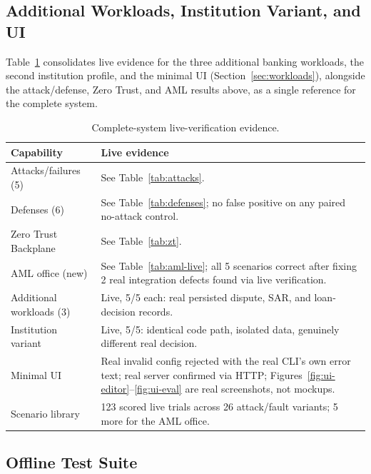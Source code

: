 \documentclass[conference]{IEEEtran}
\begin{document}
\subsection{Additional Workloads, Institution Variant, and UI}
\label{sec:exp-workloads}

Table~\ref{tab:complete-evidence} consolidates live evidence for the three additional banking workloads, the second institution profile, and the minimal UI (Section~\ref{sec:workloads}), alongside the attack/defense, Zero Trust, and AML results above, as a single reference for the complete system.

\begin{table}[t]
\centering
\caption{Complete-system live-verification evidence.}
\label{tab:complete-evidence}
\scriptsize
\begin{tabular}{@{}p{2.1cm}p{5.2cm}@{}}
\toprule
Capability & Live evidence \\
\midrule
Attacks/failures (5) & See Table~\ref{tab:attacks}. \\
Defenses (6) & See Table~\ref{tab:defenses}; no false positive on any paired no-attack control. \\
Zero Trust Backplane & See Table~\ref{tab:zt}. \\
AML office (new) & See Table~\ref{tab:aml-live}; all 5 scenarios correct after fixing 2 real integration defects found via live verification. \\
Additional workloads (3) & Live, 5/5 each: real persisted dispute, SAR, and loan-decision records. \\
Institution variant & Live, 5/5: identical code path, isolated data, genuinely different real decision. \\
Minimal UI & Real invalid config rejected with the real CLI's own error text; real server confirmed via HTTP; Figures~\ref{fig:ui-editor}--\ref{fig:ui-eval} are real screenshots, not mockups. \\
Scenario library & 123 scored live trials across 26 attack/fault variants; 5 more for the AML office. \\
\bottomrule
\end{tabular}
\end{table}

\subsection{Offline Test Suite}
\label{sec:exp-tests}
\end{document}
